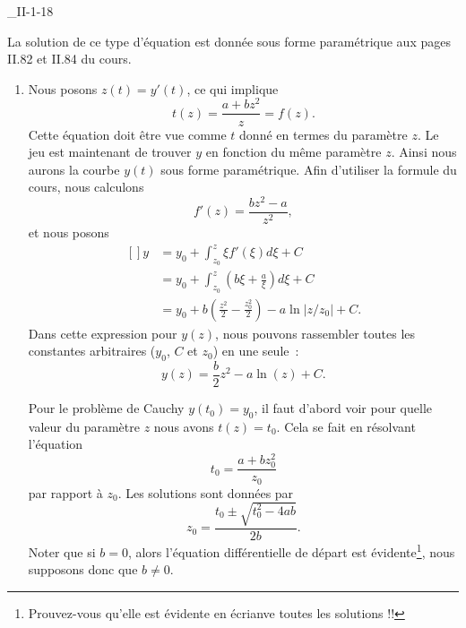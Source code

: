 

\begin{corrige}{_II-1-18}

La solution de ce type d'équation est donnée sous forme paramétrique aux pages II.82 et II.84 du cours.

\begin{enumerate}

	\item
		Nous posons $z(t)=y'(t)$, ce qui implique
		\begin{equation}
			t(z)=\frac{ a+bz^2 }{ z }=f(z).
		\end{equation}
		Cette équation doit être vue comme $t$ donné en termes du paramètre $z$. Le jeu est maintenant de trouver $y$ en fonction du même paramètre $z$. Ainsi nous aurons la courbe $y(t)$ sous forme paramétrique. Afin d'utiliser la formule du cours, nous calculons
		\begin{equation}
			f'(z)=\frac{ bz^2-a }{ z^2 },
		\end{equation}
		et nous posons
		\begin{equation}
			\begin{aligned}[]
				y	&=y_0+\int_{z_0}^z \xi f'(\xi)d\xi +C\\
				&=y_0+\int_{z_0}^z(b\xi+\frac{ a }{ \xi })d\xi	+C\\
				&=y_0+b\left( \frac{ z^2 }{ 2 }-\frac{ z_0^2 }{2} \right)-a\ln| z/z_0 |+C.
			\end{aligned}
		\end{equation}
		Dans cette expression pour $y(z)$, nous pouvons rassembler toutes les constantes arbitraires ($y_0$, $C$ et $z_0$) en une seule~:
		\begin{equation}
			y(z)=\frac{ b }{2}z^2-a\ln(z)+C.
		\end{equation}
		
		Pour le problème de Cauchy $y(t_0)=y_0$, il faut d'abord voir pour quelle valeur du paramètre $z$ nous avons $t(z)=t_0$. Cela se fait en résolvant l'équation
		\begin{equation}
			t_0=\frac{ a+bz_0^2 }{ z_0 }
		\end{equation}
		par rapport à $z_0$. Les solutions sont données par
		\begin{equation}
			z_0=\frac{ t_0\pm\sqrt{t_0^2-4ab} }{ 2b }.
		\end{equation}
		Noter que si $b=0$, alors l'équation différentielle de départ est évidente\footnote{Prouvez-vous qu'elle est évidente en écrianve toutes les solutions !!}, nous supposons donc que $b\neq 0$. 


\end{enumerate}
\end{corrige}
